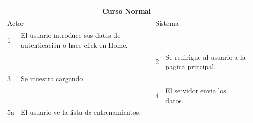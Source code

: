\begin{itemize}
\begin{itemize}
\begin{table}[H]
      \begin{tabularx}{\textwidth}{|l|X|l|X|}
        \hline
        \multicolumn{4}{|c|}{\cellcolor[HTML]{C0C0C0}Curso Normal}                                                 \\ \hline
        \multicolumn{2}{|l|}{\cellcolor[HTML]{EFEFEF}Actor} & \multicolumn{2}{l|}{\cellcolor[HTML]{EFEFEF}Sistema} \\ \hline
        1                         & El usuario introduce sus datos de autenticación o hace click en Home.                        &                            &                         \\ \hline
                                  &                         & 2                          & Se redirigue al usuario a la pagina principal.                      \\ \hline
        3                         &   Se muestra cargando                      &                           &                    \\ \hline
                                  &                         & 4                          & El servidor envia los datos.                        \\ \hline
        5a                        & El usuario ve la lista de entrenamientos.      &                          &                        \\ \hline
                                  

\end{tabularx}
\end{table}
\end{itemize}
\end{itemize}
